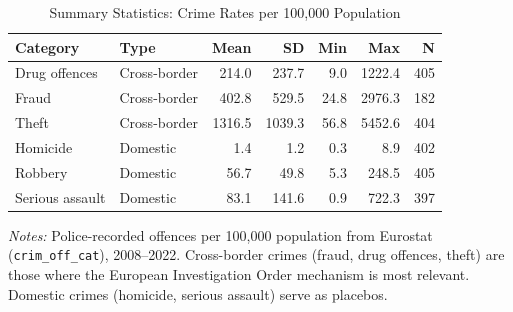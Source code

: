 \begin{table}[t]
\centering
\caption{Summary Statistics: Crime Rates per 100,000 Population}
\label{tab:summary}
\begin{tabular}{llrrrrr}
\hline\hline
Category & Type & Mean & SD & Min & Max & N \\
\hline
Drug offences & Cross-border & 214.0 & 237.7 & 9.0 & 1222.4 & 405 \\
Fraud & Cross-border & 402.8 & 529.5 & 24.8 & 2976.3 & 182 \\
Theft & Cross-border & 1316.5 & 1039.3 & 56.8 & 5452.6 & 404 \\
Homicide & Domestic & 1.4 & 1.2 & 0.3 & 8.9 & 402 \\
Robbery & Domestic & 56.7 & 49.8 & 5.3 & 248.5 & 405 \\
Serious assault & Domestic & 83.1 & 141.6 & 0.9 & 722.3 & 397 \\
\hline\hline
\end{tabular}
\begin{tablenotes}
\item \textit{Notes:} Police-recorded offences per 100,000 population from Eurostat (\texttt{crim\_off\_cat}), 2008--2022. Cross-border crimes (fraud, drug offences, theft) are those where the European Investigation Order mechanism is most relevant. Domestic crimes (homicide, serious assault) serve as placebos.
\end{tablenotes}
\end{table}
